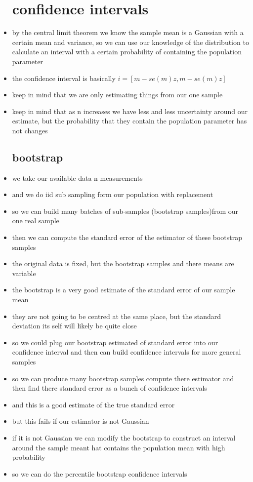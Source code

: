 \documentclass{article}
\begin{document}
\begin{itemize}
\section{confidence intervals}
\item by the central limit theorem we know the sample mean is a Gaussian with a certain mean and variance, so we can use our knowledge of the distribution to calculate an interval with a certain probability of containing the population parameter
\item the confidence interval is basically $i=[m-se(m)z,m-se(m)z]$
\item keep in mind that we are only estimating things from our one sample
\item keep in mind that as n increases we have less and less uncertainty around our estimate, but the probability that they contain the population parameter has not changes
\subsection{bootstrap}
\item we take our available data n measurements
\item and we do iid sub sampling form our population with replacement 
\item so we can build many batches of sub-samples (bootstrap samples)from our one real sample
\item then we can compute the standard error of the estimator of these bootstrap samples
\item the original data is fixed, but the bootstrap samples and there means are variable
\item the bootstrap is a very good estimate of the standard error of our sample mean 
\item they are not going to be centred at the same place, but the standard deviation its self will likely be quite close
\item so we could plug our bootstrap estimated of standard error into our confidence interval and then can build confidence intervals for more general samples
\item so we can produce many bootstrap samples compute there estimator and then find there standard error as a bunch of confidence intervals 
\item and this is a good estimate of the true standard error
\item but this fails if our estimator is not Gaussian 
\item if it is not Gaussian we can modify the bootstrap to construct an interval around the sample meant hat contains the population mean with high probability
\item so we can do the percentile bootstrap confidence  intervals
\end{itemize}
\end{document}
